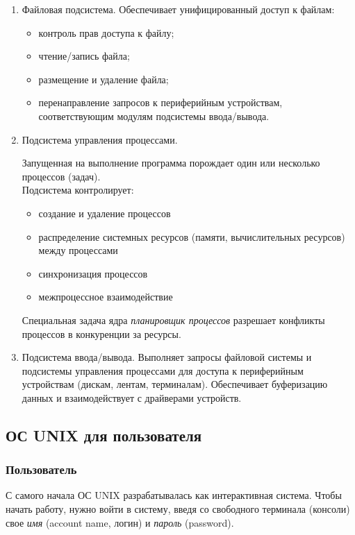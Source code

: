 \begin{enumerate}
\item  Файловая подсистема. Обеспечивает унифицированный доступ к файлам:
	\begin{itemize}
	\item контроль прав доступа к файлу;
	\item чтение/запись файла;
	\item размещение и удаление файла;
	\item перенаправление запросов  к периферийным устройствам, соответствующим модулям подсистемы ввода/вывода.
	\end{itemize}
\item  Подсистема управления процессами.
 
	Запущенная на выполнение программа порождает один или несколько процессов (задач). \\
Подсистема контролирует:
	\begin{itemize}
	\item создание и удаление процессов
	\item распределение системных ресурсов (памяти, вычислительных ресурсов) между процессами
	\item синхронизация процессов
	\item межпроцессное взаимодействие
	\end{itemize}

  Специальная задача ядра  \emph{планировщик процессов} разрешает конфликты процессов в конкуренции за ресурсы. 
\item Подсистема ввода/вывода. Выполняет запросы файловой системы и подсистемы управления процессами для доступа к периферийным устройствам (дискам, лентам, терминалам). Обеспечивает буферизацию данных и взаимодействует с драйверами устройств.
\end{enumerate}

\subsection{ОС UNIX для пользователя}
\subsubsection{Пользователь}

С самого начала ОС UNIX разрабатывалась как интерактивная система. Чтобы начать работу, нужно войти в систему, введя со свободного терминала (консоли) свое \emph{имя} (account name, логин) и \emph{пароль} (password).

